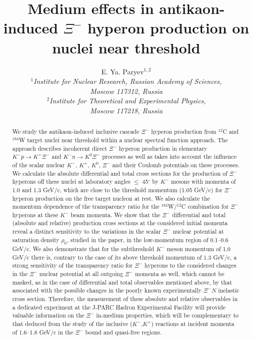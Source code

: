 \documentclass[12pt]{article}
\begin{document}
\title{Medium effects in antikaon-induced $\Xi^-$ hyperon production
 on nuclei near threshold}
\author{E. Ya. Paryev$^{1,2}$\\
{\it $^1$Institute for Nuclear Research, Russian Academy of Sciences,}\\
{\it Moscow 117312, Russia}\\
{\it $^2$Institute for Theoretical and Experimental Physics,}\\
{\it Moscow 117218, Russia}}

\renewcommand{\today}{}
\maketitle

\begin{abstract}
We study the antikaon-induced inclusive cascade $\Xi^-$ hyperon
production from $^{12}$C and $^{184}$W target nuclei near threshold within a nuclear spectral function
approach. The approach describes incoherent direct $\Xi^-$ hyperon production in elementary
${K^-}p \to {K^+}\Xi^-$ and ${K^-}n \to {K^0}\Xi^-$ processes as well as takes into account the influence
of the scalar nuclear $K^-$, $K^+$, $K^0$, $\Xi^-$ and their Coulomb potentials on these processes.
We calculate the absolute differential and total cross sections for the production of $\Xi^-$ hyperons
off these nuclei at laboratory angles $\le$ 45$^{\circ}$ by $K^-$ mesons with momenta of 1.0 and 1.3 GeV/c,
which are close to the threshold momentum (1.05 GeV/c) for $\Xi^-$ hyperon production on the free
target nucleon at rest. We also calculate the momentum dependence of the transparency ratio for the
$^{184}$W/$^{12}$C combination for $\Xi^-$ hyperons at these $K^-$ beam momenta.
We show that the $\Xi^-$ differential and total (absolute and relative) production cross sections
at the considered initial momenta reveal a distinct sensitivity to the variations
in the scalar $\Xi^-$ nuclear potential at saturation density $\rho_0$, studied in the paper,
in the low-momentum region of 0.1--0.6 GeV/c.
We also demonstrate that for the subthreshold $K^-$ meson momentum of 1.0 GeV/c there is, contrary to the
case of its above threshold momentum of 1.3 GeV/c, a strong sensitivity of the transparency ratio
for $\Xi^-$ hyperons to the considered changes in the $\Xi^-$ nuclear potential at all outgoing $\Xi^-$
momenta as well, which cannot be masked, as in the case of differential and total observables mentioned above,
by that associated with the possible changes in the poorly known experimentally ${\Xi^-}N$ inelastic cross section. Therefore, the measurement of these absolute and relative observables in a dedicated experiment at
the J-PARC Hadron Experimental Facility will provide valuable information on the $\Xi^-$ in-medium properties,
which will be complementary to that deduced from the study of the inclusive ($K^-$,$K^+$) reactions
at incident momenta of 1.6--1.8 GeV/c in the $\Xi^-$ bound and quasi-free regions.
\end{abstract}
\end{document}
